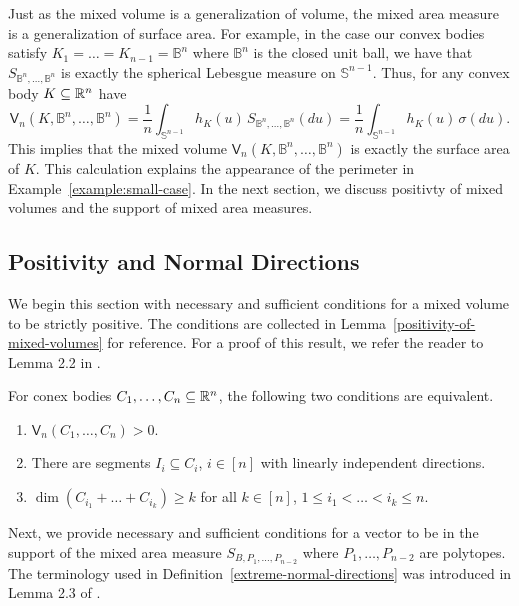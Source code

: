 \documentclass{puthesis-UG}
\begin{document}
Just as the mixed volume is a generalization of volume, the mixed area measure is a generalization of surface area. For example, in the case our convex bodies satisfy $K_1 = \ldots = K_{n-1} = \mathbb{B}^n$ where $\mathbb{B}^n$ is the closed unit ball, we have that $S_{\mathbb{B}^n, \ldots, \mathbb{B}^n}$ is exactly the spherical Lebesgue measure on $\mathbb{S}^{n-1}$. Thus, for any convex body $K \subseteq \mathbb{R}^n$ have 
\[
	\mathsf{V}_n (K, \mathbb{B}^n, \ldots, \mathbb{B}^n ) = \frac{1}{n} \int_{\mathbb{S}^{n-1}} h_K(u) \, S_{\mathbb{B}^n, \ldots, \mathbb{B}^n} (du) = \frac{1}{n} \int_{\mathbb{S}^{n-1}} h_K(u) \, \sigma (du). 
\]
This implies that the mixed volume $\mathsf{V}_n (K, \mathbb{B}^n, \ldots, \mathbb{B}^n)$ is exactly the surface area of $K$. This calculation explains the appearance of the perimeter in Example~\ref{example:small-case}. In the next section, we discuss positivty of mixed volumes and the support of mixed area measures. 

\subsection{Positivity and Normal Directions}

We begin this section with necessary and sufficient conditions for a mixed volume to be strictly positive. The conditions are collected in Lemma~\ref{positivity-of-mixed-volumes} for reference. For a proof of this result, we refer the reader to Lemma 2.2 in \cite{shenfeld2022extremals}.

\begin{lem} \label{positivity-of-mixed-volumes}
	For conex bodies $C_1, \ldots, C_n \subseteq \mathbb{R}^n$, the following two conditions are equivalent.
	\begin{enumerate}[label = (\alph*)]
		\item $\mathsf{V}_n (C_1, \ldots, C_n) > 0$. 
		\item There are segments $I_i \subseteq C_i$, $i \in [n]$ with linearly independent directions. 
		\item $\dim (C_{i_1} + \ldots + C_{i_k}) \geq k$ for all $k \in [n]$, $1 \leq i_1 < \ldots < i_k \leq n$. 
	\end{enumerate}
\end{lem}

Next, we provide necessary and sufficient conditions for a vector to be in the support of the mixed area measure $S_{B, P_1, \ldots, P_{n-2}}$ where $P_1, \ldots, P_{n-2}$ are polytopes. The terminology used in Definition~\ref{extreme-normal-directions} was introduced in Lemma 2.3 of \cite{shenfeld2022extremals}. 
\end{document}
